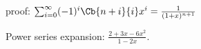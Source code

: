 \documentclass{ctexart}
\newif\ifpreface
\begin{document}
\large
\setlength{\baselineskip}{1.2em}
\ifpreface

\newgeometry{left=2cm,right=2cm,top=2cm,bottom=2cm}
\else
{}
\maketitle
\fi

\begin{problem}
proof: $\sum_{i=0}^{\infty}(-1)^i\Cb{n+i}{i}x^i=\frac{1}{(1+x)^{n+1}}$
\end{problem}

\begin{problem}
Power series expansion: $\frac{2+3x-6x^2}{1-2x}$.
\end{problem}
\end{document}
